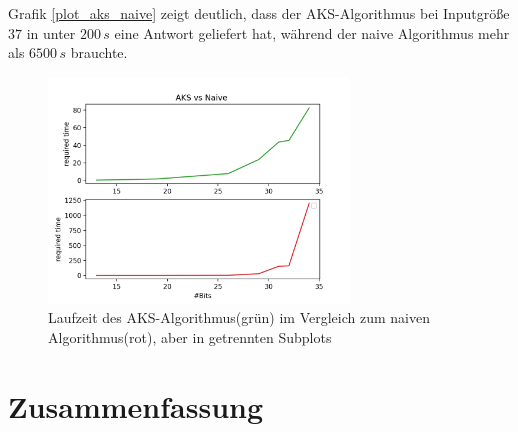 \documentclass[12pt,oneside]{article}
\theoremstyle{remark}
\theoremstyle{definition}
\begin{document}
Grafik \ref{plot_aks_naive} zeigt deutlich, dass der AKS-Algorithmus bei Inputgröße $37$ in unter $200 \, s$ eine Antwort geliefert hat, während der naive Algorithmus mehr als $6500 \, s$ brauchte.


\begin{figure}[h]
\includegraphics[width=8cm]{plots/aksVsNaiveSubPlots.png}
\centering
\caption{Laufzeit des AKS-Algorithmus(grün) im Vergleich zum naiven Algorithmus(rot), aber in getrennten Subplots}
\end{figure}

\section{Zusammenfassung}


\clearpage
\lhead{}
\printbibliography
{}


\clearpage
\appendix
\end{document}
